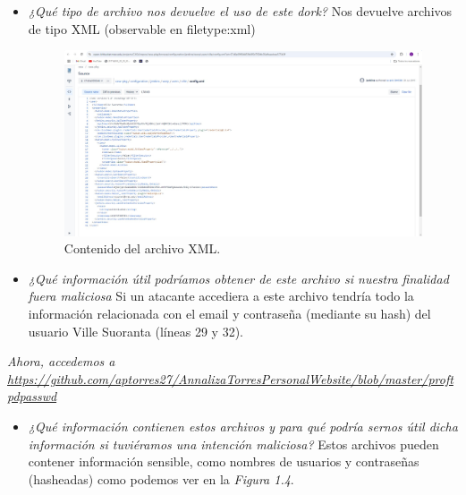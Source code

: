 \documentclass[12pt]{book}
\begin{document}
\begin{itemize}
    \item \textit{¿Qué tipo de archivo nos devuelve el uso de este dork?}
    \newline
    Nos devuelve archivos de tipo XML (observable en filetype:xml)
    \begin{figure}[h]
        \centering
        \includegraphics[width=\linewidth]{Practica 3y4/images/WhatsApp Image 2024-10-24 at 09.37.38.jpeg}
        \caption{Contenido del archivo XML.}
        \label{fig:enter-label}
    \end{figure}
    
    \item \textit{¿Qué información útil podríamos obtener de este archivo si nuestra finalidad fuera maliciosa}
    \newline
    Si un atacante accediera a este archivo tendría todo la información relacionada con el email y contraseña (mediante su hash) del usuario Ville Suoranta (líneas 29 y 32).
   
\end{itemize}

\textit{Ahora, accedemos a\\ \url{https://github.com/aptorres27/AnnalizaTorresPersonalWebsite/blob/master/proftpdpasswd}}
\begin{itemize}
    \item \textit{¿Qué información contienen estos archivos y para qué podría sernos útil dicha información si tuviéramos una intención maliciosa?}
    \newline
    Estos archivos pueden contener información sensible, como nombres de usuarios y contraseñas (hasheadas) como podemos ver en la \textit{Figura 1.4}.
\end{itemize}

\end{document}

